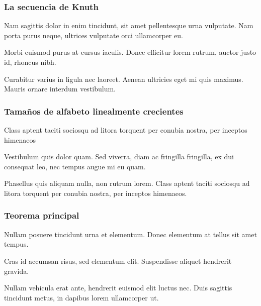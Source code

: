\documentclass[t, 10pt, mathserif]{beamer}
\begin{document}
\begin{frame}
  \frametitle{La secuencia de Knuth}

  Nam sagittis dolor in enim tincidunt, sit amet pellentesque urna vulputate. Nam porta purus neque, ultrices vulputate orci ullamcorper eu.
  \pause

  \medskip
  \begin{problem}
    Morbi euismod purus at cursus iaculis. Donec efficitur lorem rutrum, auctor justo id, rhoncus nibh.
  \end{problem}
  \pause

  \medskip
  \begin{theorem}
    Curabitur varius in ligula nec laoreet. Aenean ultricies eget mi quis maximus. Mauris ornare interdum vestibulum.
  \end{theorem}
\end{frame}


\begin{frame}
  \frametitle{Tamaños de alfabeto linealmente crecientes}

  \medskip
  \begin{theorem}
    Class aptent taciti sociosqu ad litora torquent per conubia nostra, per inceptos himenaeos
  \end{theorem}
  \pause

  \medskip
  \begin{corollary}
    Vestibulum quis dolor quam. Sed viverra, diam ac fringilla fringilla, ex dui consequat leo, nec tempus augue mi eu quam.
  \end{corollary}
  \pause

  \medskip
  \begin{theorem}
    Phasellus quis aliquam nulla, non rutrum lorem. Class aptent taciti sociosqu ad litora torquent per conubia nostra, per inceptos himenaeos.
  \end{theorem}
\end{frame}


\begin{frame}
  \frametitle{Teorema principal}

  Nullam posuere tincidunt urna et elementum. Donec elementum at tellus sit amet tempus.
  \pause

  \medskip
  \begin{problem}
    Cras id accumsan risus, sed elementum elit. Suspendisse aliquet hendrerit gravida.
  \end{problem}
  \pause

  \medskip
  \begin{theorem}
    Nullam vehicula erat ante, hendrerit euismod elit luctus nec. Duis sagittis tincidunt metus, in dapibus lorem ullamcorper ut.
  \end{theorem}
\end{frame}
\end{document}
